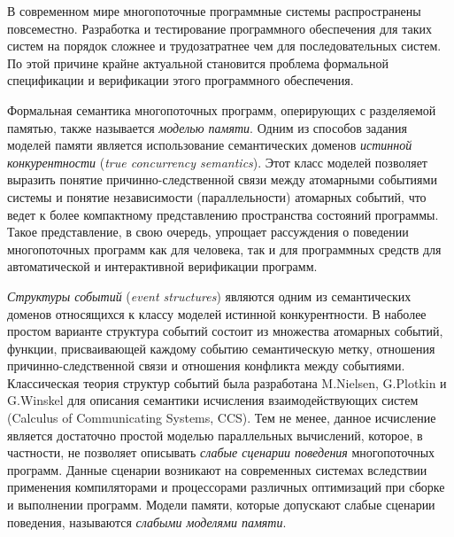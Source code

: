 
{\actuality} 
В современном мире многопоточные программные системы распространены повсеместно. 
Разработка и тестирование программного обеспечения для таких систем на порядок 
сложнее и трудозатратнее чем для последовательных систем. 
По этой причине крайне актуальной становится проблема 
формальной спецификации и верификации этого программного обеспечения. 

Формальная семантика многопоточных программ, оперирующих с разделяемой памятью,
также называется \emph{моделью памяти}.
Одним из способов задания моделей памяти
является использование семантических доменов
\emph{истинной конкурентности} (\emph{true concurrency semantics}).
Этот класс моделей позволяет выразить
понятие причинно-следственной связи между атомарными событиями системы
и понятие независимости (параллельности) атомарных событий,
что ведет к более компактному представлению пространства состояний программы.
Такое представление, в свою очередь, упрощает рассуждения 
о поведении многопоточных программ как для человека, 
так и для программных средств для автоматической и интерактивной верификации программ. 

\emph{Структуры событий} (\emph{event structures}) являются одним из семантических доменов 
относящихся к классу моделей истинной конкурентности.
В наболее простом варианте структура событий состоит из множества атомарных событий,
функции, присваивающей каждому событию семантическую метку,
отношения причинно-следственной связи и отношения конфликта между событиями.
Классическая теория структур событий была разработана M.Nielsen, G.Plotkin и G.Winskel
для описания семантики исчисления взаимодействующих систем (Calculus of Communicating Systems, CCS).
Тем не менее, данное исчисление является достаточно простой моделью параллельных вычислений,
которое, в частности, не позволяет описывать 
\emph{слабые сценарии поведения} многопоточных программ.
Данные сценарии возникают на современных системах вследствии 
применения компиляторами и процессорами
различных оптимизаций при сборке и выполнении программ.
Модели памяти, которые допускают слабые сценарии поведения, называются \emph{слабыми моделями памяти}.

